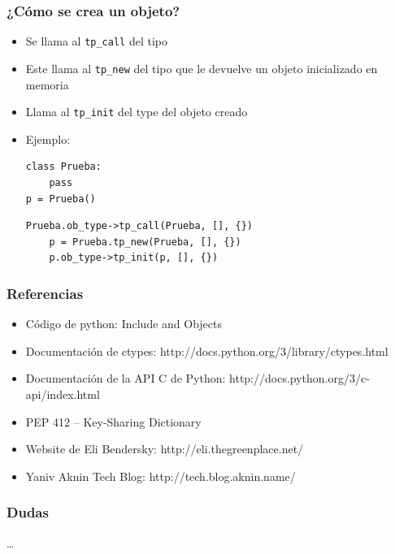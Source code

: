 \documentclass[10pt]{beamer}
\begin{document}
  \begin{frame}[containsverbatim]
    \frametitle{¿Cómo se crea un objeto?}
    \begin{itemize}
      \item Se llama al \verb+tp_call+ del tipo
      \item Este llama al \verb+tp_new+ del tipo que le devuelve un objeto inicializado en memoria
      \item Llama al \verb+tp_init+ del type del objeto creado
      \item Ejemplo:
        \begin{verbatim}
class Prueba:
    pass
p = Prueba()
        \end{verbatim}
        \begin{verbatim}
Prueba.ob_type->tp_call(Prueba, [], {})
    p = Prueba.tp_new(Prueba, [], {})
    p.ob_type->tp_init(p, [], {})
        \end{verbatim}
    \end{itemize}
  \end{frame}

  \begin{frame}[containsverbatim]
    \frametitle{Referencias}
    \begin{itemize}
      \item Código de python: Include and Objects
      \item Documentación de ctypes: http://docs.python.org/3/library/ctypes.html
      \item Documentación de la API C de Python: http://docs.python.org/3/c-api/index.html
      \item PEP 412 -- Key-Sharing Dictionary
      \item Website de Eli Bendersky: http://eli.thegreenplace.net/
      \item Yaniv Aknin Tech Blog: http://tech.blog.aknin.name/
    \end{itemize}
  \end{frame}

  \begin{frame}[containsverbatim]
    \frametitle{Dudas}
    \dots
  \end{frame}
\end{document}
